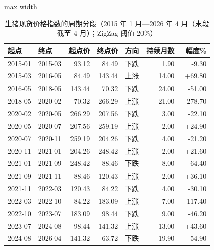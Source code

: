 \begin{table}[htbp]
\centering
\small
\caption{生猪现货价格指数的周期分段（2015 年 1 月---2026 年 4 月（末段截至 4 月）；ZigZag 阈值 20\%）}
\label{tab:hog-legs-long}
\begin{adjustbox}{max width=\textwidth}
\begin{tabular}{@{}llrrlrr@{}}
\toprule
起点 & 终点 & 起点价 & 终点价 & 方向 & 持续月数 & 幅度\% \\
\midrule
2015-01 & 2015-03 & 93.12 & 84.49 & 下跌 & 1.90 & -9.30 \\
2015-03 & 2016-05 & 84.49 & 143.44 & 上涨 & 14.00 & +69.80 \\
2016-05 & 2018-05 & 143.44 & 70.32 & 下跌 & 24.00 & -51.00 \\
2018-05 & 2020-02 & 70.32 & 266.29 & 上涨 & 21.00 & +278.70 \\
2020-02 & 2020-05 & 266.29 & 207.56 & 下跌 & 3.00 & -22.10 \\
2020-05 & 2020-07 & 207.56 & 259.19 & 上涨 & 2.00 & +24.90 \\
2020-07 & 2020-11 & 259.19 & 204.26 & 下跌 & 4.00 & -21.20 \\
2020-11 & 2021-01 & 204.26 & 248.42 & 上涨 & 2.00 & +21.60 \\
2021-01 & 2021-09 & 248.42 & 88.46 & 下跌 & 8.00 & -64.40 \\
2021-09 & 2021-11 & 88.46 & 120.43 & 上涨 & 2.00 & +36.10 \\
2021-11 & 2022-03 & 120.43 & 84.22 & 下跌 & 4.00 & -30.10 \\
2022-03 & 2022-10 & 84.22 & 183.09 & 上涨 & 7.00 & +117.40 \\
2022-10 & 2023-07 & 183.09 & 98.44 & 下跌 & 9.00 & -46.20 \\
2023-07 & 2024-08 & 98.44 & 141.32 & 上涨 & 13.00 & +43.60 \\
2024-08 & 2026-04 & 141.32 & 63.72 & 下跌 & 19.90 & -54.90 \\
\bottomrule
\end{tabular}
\end{adjustbox}
\end{table}
